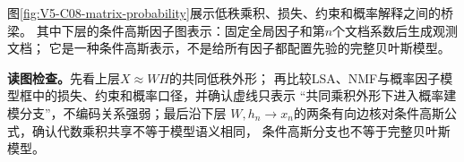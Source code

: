 \documentclass[UTF8,a4paper,11pt,openany]{ctexbook}
\begin{document}
\setcounter{page}{737}
\setcounter{chapter}{37}
\setcounter{section}{2}
\setcounter{figure}{3}
\pagestyle{headings}
图\ref{fig:V5-C08-matrix-probability}展示低秩乘积、损失、约束和概率解释之间的桥梁。
其中下层的条件高斯因子图表示：固定全局因子和第$n$个文档系数后生成观测文档；
它是一种条件高斯表示，不是给所有因子都配置先验的完整贝叶斯模型。

\FloatBarrier
\noindent\textbf{读图检查。}先看上层$X\approx WH$的共同低秩外形；
再比较LSA、NMF与概率因子模型框中的损失、约束和概率口径，并确认虚线只表示
“共同乘积外形下进入概率建模分支”，不编码关系强弱；最后沿下层
$W,h_n\to x_n$的两条有向边核对条件高斯公式，确认代数乘积共享不等于模型语义相同，
条件高斯分支也不等于完整贝叶斯模型。
\end{document}
